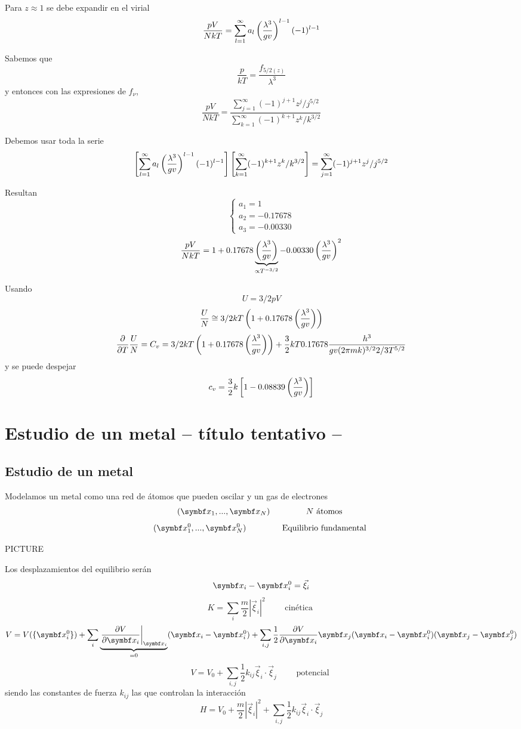 \documentclass[10pt,oneside]{CBFT_book}
\begin{document}
Para $z \approx 1$ se debe expandir en el virial
\[
	\frac{pV}{NkT} = \sum_{l=1}^\infty a_l \left( \frac{ \lambda^3 }{ gv } \right)^{l-1} (-1)^{l-1}
\]

Sabemos que 
\[
	\frac{p}{kT} = \frac{f_{5/2(z)}}{\lambda^3}
\]
y entonces con las expresiones de $f_\nu$,
\[
	\frac{pV}{NkT} = \frac{ \sum_{j=1}^\infty (-1)^{j+1} z^j / j^{5/2} }
	{ \sum_{k=1}^\infty (-1)^{k+1} z^k / k^{3/2} }
\]

Debemos usar toda la serie 
\[
	\left[ \sum_{l=1}^\infty a_l \left( \frac{ \lambda^3 }{ gv } \right)^{l-1} (-1)^{l-1} \right]
	\left[ \sum_{k=1}^\infty (-1)^{k+1} z^k / k^{3/2} \right] =
	\sum_{j=1}^\infty (-1)^{j+1} z^j / j^{5/2}
\]

Resultan
\[
	\begin{cases}
	 a_1 = 1 \\
	 a_2 = -0.17678 \\
	 a_3 = -0.00330
	\end{cases}
\]
\[
	\frac{pV}{NkT} = 1 + 0.17678 \underbrace{\left( \frac{ \lambda^3 }{ gv } \right)}_{\propto T^{-3/2}} 
	- 0.00330\left( \frac{ \lambda^3 }{ gv } \right)^2
\]

Usando 
\[
	U = 3/2 p V
\]
\[
	\frac{U}{N} \cong 3/2 kT \left( 1 + 0.17678 \left( \frac{ \lambda^3 }{ gv } \right) \right)
\]
\[
	\frac{\partial^{\hspace{-0.05em}} {}}{\partial {T}^{\hspace{-0.05em}}} \frac{U}{N} = C_v = 3/2 kT \left( 1 + 0.17678 \left( \frac{ \lambda^3 }{ gv } \right) \right)
	+ \frac{3}{2} kT 0.17678 \frac{h^3}{gv(2\pi mk)^{3/2}2/3 T^{5/2}}
\]
y se puede despejar
\[
	c_v = \frac{3}{2} k \left[ 1- 0.08839 \left( \frac{ \lambda^3 }{ gv } \right)  \right]
\]

\section{Estudio de un metal -- título tentativo --}

\subsection{Estudio de un metal}

Modelamos un metal como una red de átomos que pueden oscilar y un gas de electrones
\[
	(\vb{x}_1, ...,\vb{x}_N ) \qquad \qquad \text{ $N$ átomos }
\]
\[
	(\vb{x}_1^0, ...,\vb{x}_N^0 ) \qquad \qquad \text{ Equilibrio fundamental }
\]

PICTURE 

Los desplazamientos del equilibrio serán 
\[
	\vb{x}_i - \vb{x}_i^0 = \vec{\xi}_i
\]
\[
	K = \sum_i \frac{m}{2} | \vec{\xi}_i|^2 \qquad \text{ cinética }
\]
\[
	V = V(\{ \vb{x}_i^0 \}) + \sum_i \underbrace{\left. \dpar{V}{\vb{x}_i}\right|_{\vb{x}_i}}_{=0}
	(\vb{x}_i-\vb{x}_i^0) + 
	\sum_{i,j} \frac{1}{2} \dpar{V}{\vb{x}_i}{\vb{x}_j} (\vb{x}_i-\vb{x}_i^0) (\vb{x}_j-\vb{x}_j^0)
\]
\[
	V = V_0 + \sum_{i,j} \frac{1}{2} k_{ij}  \vec{\xi}_i\cdot  \vec{\xi}_j \qquad \text{ potencial }
\]
siendo las constantes de fuerza $k_{ij}$ las que controlan la interacción 
\[
	H = V_0 + \frac{m}{2} | \vec{\xi}_i|^2  + \sum_{i,j} \frac{1}{2} k_{ij}  \vec{\xi}_i\cdot  \vec{\xi}_j
\]
\end{document}
